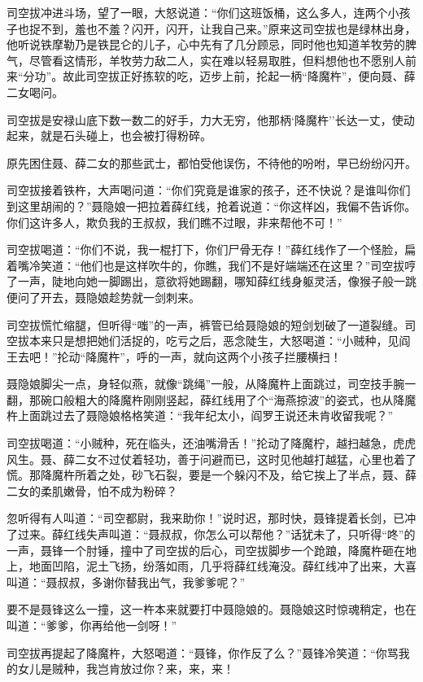 \documentclass[12pt,oneside]{book}
\begin{document}
司空拔冲进斗场，望了一眼，大怒说道：``你们这班饭桶，这么多人，连两个小孩子也捉不到，羞也不羞？闪开，闪开，让我自己来。''原来这司空拔也是绿林出身，他听说铁摩勒乃是铁昆仑的儿子，心中先有了几分顾忌，同时他也知道羊牧劳的脾气，尽管看这情形，羊牧劳力敌二人，实在难以轻易取胜，但料想他也不愿别人前来``分功''。故此司空拔正好拣软的吃，迈步上前，抡起一柄``降魔杵''，便向聂、薛二女喝问。

司空拔是安禄山底下数一数二的好手，力大无穷，他那柄`降魔杵''长达一丈，使动起来，就是石头碰上，也会被打得粉碎。

原先困住聂、薛二女的那些武士，都怕受他误伤，不待他的吩咐，早已纷纷闪开。

司空拔接着铁杵，大声喝问道：``你们究竟是谁家的孩子，还不快说？是谁叫你们到这里胡闹的？''聂隐娘一把拉着薛红线，抢着说道：``你这样凶，我偏不告诉你。你们这许多人，欺负我的王叔叔，我们瞧不过眼，非来帮他不可！''

司空拔喝道：``你们不说，我一棍打下，你们尸骨无存！''薛红线作了一个怪脸，扁着嘴冷笑道：``他们也是这样吹牛的，你瞧，我们不是好端端还在这里？''司空拔哼了一声，陡地向她一脚踢出，意欲将她踢翻，哪知薛红线身躯灵活，像猴子般一跳便问了开去，聂隐娘趁势就一剑刺来。

司空拔慌忙缩腿，但听得``嗤''的一声，裤管已给聂隐娘的短剑划破了一道裂缝。司空拔本来只是想把她们活捉的，吃亏之后，恶念陡生，大怒喝道：``小贼种，见阎王去吧！''抡动``降魔杵''，呼的一声，就向这两个小孩子拦腰横扫！

聂隐娘脚尖一点，身轻似燕，就像``跳绳''一般，从降魔杵上面跳过，司空技手腕一翻，那碗口般粗大的降魔杵刚刚竖起，薛红线用了个``海燕掠波''的姿式，也从降魔杵上面跳过去了聂隐娘格格笑道：``我年纪太小，阎罗王说还未肯收留我呢？''

司空拔喝道：``小贼种，死在临头，还油嘴滑舌！''抡动了降魔柠，越扫越急，虎虎风生。聂、薛二女不过仗着轻功，善于问避而已，这时见他越打越猛，心里也着了慌。那降魔杵所着之处，砂飞石裂，要是一个躲闪不及，给它挨上了半点，聂、薛二女的柔肌嫩骨，怕不成为粉碎？

忽听得有人叫道：``司空都尉，我来助你！''说时迟，那时快，聂锋提着长剑，已冲了过来。薛红线失声叫道：``聂叔叔，你怎么可以帮他？''话犹未了，只听得``咚''的一声，聂锋一个肘锤，撞中了司空拔的后心，司空拔脚步一个跄踉，降魔杵砸在地上，地面凹陷，泥土飞扬，纷落如雨，几乎将薛红线淹没。薛红线冲了出来，大喜叫道：``聂叔叔，多谢你替我出气，我爹爹呢？''

要不是聂锋这么一撞，这一杵本来就要打中聂隐娘的。聂隐娘这时惊魂稍定，也在叫道：``爹爹，你再给他一剑呀！''

司空拔再提起了降魔杵，大怒喝道：``聂锋，你作反了么？''聂锋冷笑道：``你骂我的女儿是贼种，我岂肯放过你？来，来，来！
\end{document}
